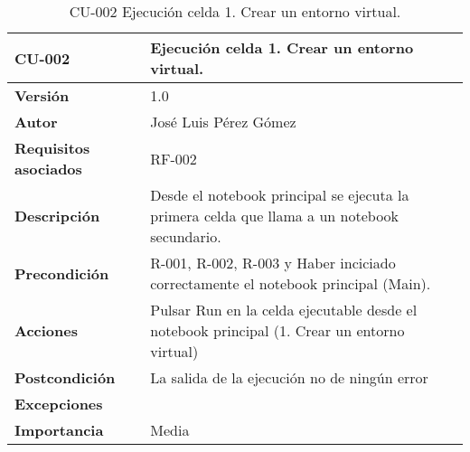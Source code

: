 \begin{table}[p]
	\centering
	\begin{tabularx}{\linewidth}{ p{} p{} }
		\toprule
		\textbf{CU-002}    & \textbf{Ejecución celda 1. Crear un entorno virtual.}\\
		\toprule
		\textbf{Versión}              & 1.0    \\
		\textbf{Autor}                & José Luis Pérez Gómez \\
		\textbf{Requisitos asociados} & RF-002 \\
		\textbf{Descripción}          & Desde el notebook principal se ejecuta la primera celda que llama a un notebook secundario. \\
		\textbf{Precondición}         & R-001, R-002, R-003 y Haber inciciado correctamente el notebook principal (Main). \\
		\textbf{Acciones}             & Pulsar Run en la celda ejecutable desde el notebook principal (1. Crear un entorno virtual)\\
		\textbf{Postcondición}        & La salida de la ejecución no de ningún error\\
		\textbf{Excepciones}          &  \\
		\textbf{Importancia}          & Media \\
		\bottomrule
	\end{tabularx}
	\caption{CU-002 Ejecución celda 1. Crear un entorno virtual.}
\end{table}



